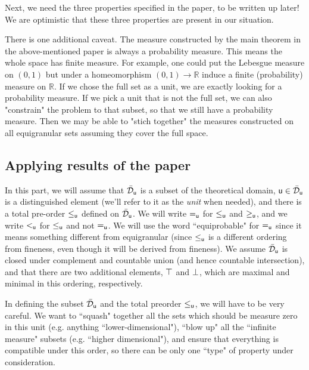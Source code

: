 \documentclass[10pt, onecolumn, nofootinbib]{revtex4-1}
\begin{document}
Next, we need the three properties specified in the paper, to be written up later! We are optimistic that these three properties are present in our situation. 

There is one additional caveat. The measure constructed by the main theorem in the above-mentioned paper is always a probability measure. This means the whole space has finite measure. For example, one could put the Lebesgue measure on $(0,1)$ but under a homeomorphism $(0,1)\to\mathbb{R}$ induce a finite (probability) measure on  $\mathbb{R}$. If we chose the full set as a unit, we are exactly looking for a probability measure. If we pick a unit that is not the full set, we can also "constrain" the problem to that subset, so that we still have a probability measure. Then we may be able to "stich together" the measures constructed on all equigranular sets assuming they cover the full space. 

\subsection{Applying results of the paper \cite{villegas}}

In this part, we will assume that $\tdomain_{\stmt[u]}$ is a subset of the theoretical domain, $\stmt[u]\in \tdomain_{\stmt[u]}$ is a distinguished element (we'll refer to it as the \emph{unit} when needed), and there is a total pre-order $\leq_{\stmt[u]}$ defined on $\tdomain_{\stmt[u]}$. We will write $=_{\stmt[u]}$ for $\leq_{\stmt[u]}$ and $\geq_{\stmt[u]}$, and we write $<_{\stmt[u]}$ for $\leq_{\stmt[u]}$ and not $=_{\stmt[u]}$. We will use the word ``equiprobable" for $=_{\stmt[u]}$ since it means something different from equigranular (since $\leq_{\stmt[u]}$ is a different ordering from fineness, even though it will be derived from fineness). We assume $\tdomain_{\stmt[u]}$ is closed under complement and countable union (and hence countable intersection), and that there are two additional elements, $\certainty$ and $\impossibility$, which are maximal and minimal in this ordering, respectively.

\begin{remark}
In defining the subset $\tdomain_{\stmt[u]}$ and the total preorder $\leq_{\stmt[u]}$, we will have to be very careful. We want to ``squash" together all the sets which should be measure zero in this unit (e.g. anything ``lower-dimensional"), ``blow up" all the ``infinite measure" subsets (e.g. ``higher dimensional"), and ensure that everything is compatible under this order, so there can be only one ``type" of property under consideration. 
\end{remark}
\end{document}
